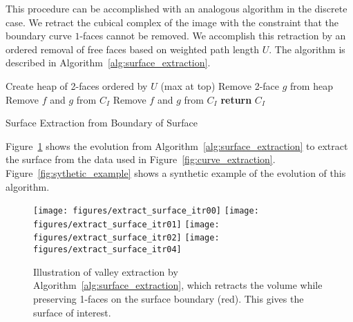 \documentclass[10pt,journal,compsoc]{IEEEtran}
\newcommand{\comment}[1]{ }
\begin{document}
\comment{
This results in fronts that have large distance
$U$ from the seed point being removed first. By the constraint, only
the parts of the fronts that do not touch the boundary can be
removed. As the removal progresses, faces are removed on either side
of the surface. This creates a ``wrapping'' effect around the surface
of interest, which have small values of $U$. Near the end of the
algorithm, points on the surface cannot be removed without creating a
hole, so no faces are free, and thus the algorithm stops.}

This procedure can be accomplished with an analogous algorithm in the
discrete case. We retract the cubical complex of the image with the
constraint that the boundary curve $1$-faces cannot be removed. We
accomplish this retraction by an ordered removal of free faces based
on weighted path length $U$. The algorithm is described in
Algorithm~\ref{alg:surface_extraction}.
\begin{algorithm}
  \begin{algorithmic}[1]
    \State {}
    \State {}
    \State Create heap of 2-faces ordered by $U$ (max at top)
    \Repeat
    \State Remove 2-face $g$ from heap
    \State Remove $f$ and $g$ from $C_I$
    \State Remove $f$ and $g$ from $C_I$
    \EndIf
    \State \textbf{return} $C_I$ 
    \EndProcedure
  \end{algorithmic}
  \caption{Surface Extraction from Boundary of Surface}
  \label{alg:surface_extraction}
\end{algorithm}
Figure~\ref{fig:valley_extraction} shows the evolution from
Algorithm~\ref{alg:surface_extraction} to extract the surface from the
data used in
Figure~\ref{fig:curve_extraction}. Figure~\ref{fig:sythetic_example}
shows a synthetic example of the evolution of this algorithm.

\def\fHeightExtractSurfaceItr{0.8in}
\begin{figure}
  \centering
  {\scriptsize
    \texttt{[image: figures/extract\_surface\_itr00]}
    \texttt{[image: figures/extract\_surface\_itr01]}
    \texttt{[image: figures/extract\_surface\_itr02]}
    \texttt{[image: figures/extract\_surface\_itr04]}
  }
  \caption{Illustration of valley extraction by
    Algorithm~\ref{alg:surface_extraction}, which retracts the volume
    while preserving 1-faces on the surface boundary (red). This gives
    the surface of interest.}
  \label{fig:valley_extraction}
\end{figure}
\end{document}
